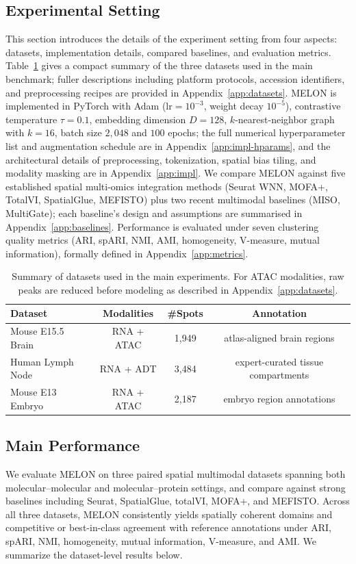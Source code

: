 \documentclass{article}
\theoremstyle{plain}
\theoremstyle{definition}
\begin{document}
\subsection{Experimental Setting}
This section introduces the details of the experiment setting from four aspects: datasets, implementation details, compared baselines, and evaluation metrics. Table~\ref{tab:dataset-summary} gives a compact summary of the three datasets used in the main benchmark; fuller descriptions including platform protocols, accession identifiers, and preprocessing recipes are provided in Appendix~\ref{app:datasets}. MELON is implemented in PyTorch with Adam ($\mathrm{lr}=10^{-3}$, weight decay $10^{-5}$), contrastive temperature $\tau{=}0.1$, embedding dimension $D{=}128$, $k$-nearest-neighbor graph with $k{=}16$, batch size $2{,}048$ and $100$ epochs; the full numerical hyperparameter list and augmentation schedule are in Appendix~\ref{app:impl-hparams}, and the architectural details of preprocessing, tokenization, spatial bias tiling, and modality masking are in Appendix~\ref{app:impl}. We compare MELON against five established spatial multi-omics integration methods (Seurat WNN, MOFA+, TotalVI, SpatialGlue, MEFISTO) plus two recent multimodal baselines (MISO, MultiGate); each baseline's design and assumptions are summarised in Appendix~\ref{app:baselines}. Performance is evaluated under seven clustering quality metrics (ARI, spARI, NMI, AMI, homogeneity, V-measure, mutual information), formally defined in Appendix~\ref{app:metrics}.

\begin{table}[H]
\centering
\caption{Summary of datasets used in the main experiments. For ATAC modalities, raw peaks are reduced before modeling as described in Appendix~\ref{app:datasets}.}
\label{tab:dataset-summary}
\small
\begin{tabular}{lccc}
\toprule
Dataset & Modalities & \#Spots & Annotation \\
\midrule
Mouse E15.5 Brain & RNA + ATAC & 1{,}949 & atlas-aligned brain regions \\
Human Lymph Node & RNA + ADT & 3{,}484 & expert-curated tissue compartments \\
Mouse E13 Embryo & RNA + ATAC & 2{,}187 & embryo region annotations \\
\bottomrule
\end{tabular}
\end{table}

\subsection{Main Performance}
We evaluate MELON on three paired spatial multimodal datasets spanning both molecular--molecular and molecular--protein settings, and compare against strong baselines including Seurat, SpatialGlue, totalVI, MOFA+, and MEFISTO. Across all three datasets, MELON consistently yields spatially coherent domains and competitive or best-in-class agreement with reference annotations under ARI, spARI, NMI, homogeneity, mutual information, V-measure, and AMI. We summarize the dataset-level results below.
\end{document}

